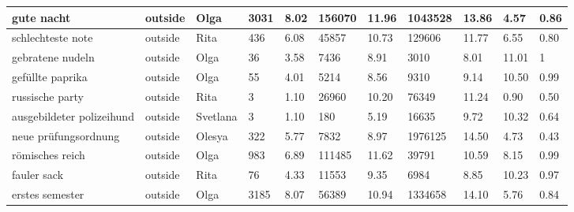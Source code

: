 \begin{longtable}{|p{3cm}|p{1cm}|p{1cm}|R{0.8cm}|R{0.8cm}|R{1.2cm}|R{1cm}|R{1.3cm}|R{1cm}|R{0.8cm}|R{0.6cm}|}
gute nacht                                                         & outside     & Olga      & 3031                & 8.02                      & 156070     & 11.96            & 1043528      & 13.86                 & 4.57  & 0.86                 \\ \hline
schlechteste note                                                  & outside     & Rita      & 436                 & 6.08                      & 45857      & 10.73            & 129606       & 11.77                 & 6.55  & 0.80                 \\ \hline
gebratene nudeln                                                   & outside     & Olga      & 36                  & 3.58                      & 7436       & 8.91             & 3010         & 8.01                  & 11.01 & 1                 \\ \hline
gef\"{u}llte paprika                                               & outside     & Olga      & 55                  & 4.01                      & 5214       & 8.56             & 9310         & 9.14                  & 10.50 & 0.99                 \\ \hline
russische party                                                 & outside     & Rita      & 3                   & 1.10                      & 26960      & 10.20            & 76349        & 11.24                 & 0.90  & 0.50                 \\ \hline
ausgebildeter polizeihund                                          & outside     & Svetlana  & 3                   & 1.10                      & 180        & 5.19             & 16635        & 9.72                  & 10.32 & 0.64                 \\ \hline
neue pr\"{u}fungsordnung & outside     & Olesya    & 322                 & 5.77                      & 7832       & 8.97             & 1976125      & 14.50                 & 4.73  & 0.43                 \\ \hline
 r\"{o}misches reich                                       & outside     & Olga      & 983                 & 6.89                      & 111485     & 11.62            & 39791        & 10.59                 & 8.15  & 0.99                 \\ \hline
fauler sack                                                        & outside     & Rita      & 76                  & 4.33                      & 11553      & 9.35             & 6984         & 8.85                  & 10.23 & 0.97                 \\ \hline
erstes semester                                                    & outside     & Olga      & 3185                & 8.07                      & 56389      & 10.94            & 1334658      & 14.10                 & 5.76  & 0.84                 \\ \hline

\end{longtable}
